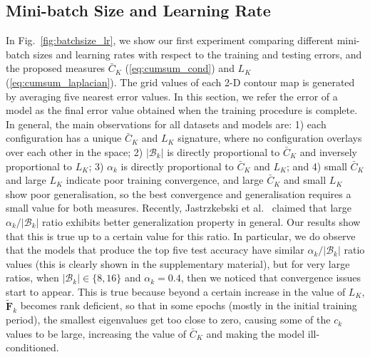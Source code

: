 \documentclass[10pt,journal,compsoc]{IEEEtran}
\begin{document}
\subsection{Mini-batch Size and Learning Rate}
\label{sec:minibatch_size_and_learning_rate}



In Fig.~\ref{fig:batchsize_lr}, we show our first experiment comparing different mini-batch sizes and learning rates with respect to the training and testing errors, and the proposed measures $\bar{C}_K$ (\ref{eq:cumsum_cond}) and $L_K$ (\ref{eq:cumsum_laplacian}).
The grid values of each 2-D contour map is generated by averaging five nearest error values.
In this section, we refer the error of a model as the final error value obtained when the training procedure is complete.  In general, the main observations for all datasets and models are:
1) each configuration has a unique $\bar{C}_K$ and $L_K$ signature, where no configuration overlays over each other in the space;
2) $|\mathcal{B}_k|$ is directly proportional to $\bar{C}_K$ and inversely proportional to $L_K$;
3) $\alpha_k$ is directly proportional to $\bar{C}_K$ and $L_K$; and
4) small $\bar{C}_K$ and large $L_K$ indicate poor training convergence, and large $\bar{C}_K$ and small $L_K$ show poor generalisation, so the best convergence and generalisation requires a small value for both measures.
Recently, Jastrzkebski et al.~\cite{jastrzkebski2017three} claimed that large $\alpha_k/|\mathcal{B}_k|$ ratio exhibits better generalization property in general.  Our results show that this is true up to a certain value for this ratio.  In particular,  we do observe that the models that produce the top five test accuracy have similar $\alpha_k/|\mathcal{B}_k|$ ratio values (this is clearly shown in the supplementary material), but for very large ratios, when $|\mathcal{B}_k| \in \{8, 16\}$ and $\alpha_k = 0.4$,
then we noticed that convergence issues start to appear.
This is true because beyond a certain increase in the value of $L_K$, $\widetilde{\mathbf{F}}_k$ becomes rank deficient, so that in some epochs (mostly in the initial training period), the smallest eigenvalues get too close to zero, causing some of the $c_k$ values to be large, increasing the value of $\bar{C}_K$ and making the model ill-conditioned.
\end{document}
